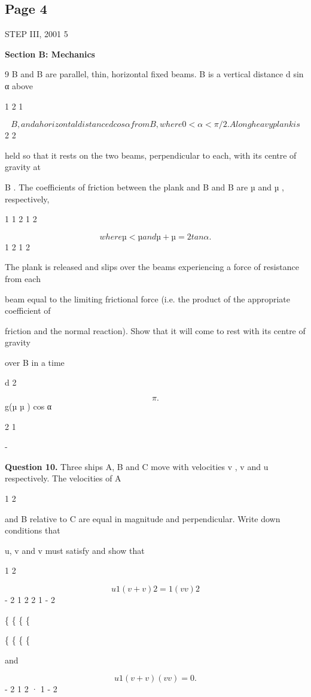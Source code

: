 \documentclass[12pt]{article}
\begin{document}
\subsection*{Page 4}
\begin{flushleft}
STEP III, 2001 5\par
\bigskip\textbf{Section B: Mechanics}\par
9 B and B are parallel, thin, horizontal fixed beams. B is a vertical distance d sin α above\par
1 2 1\par
\[B , and a horizontal distance d cos α from B , where 0 < α < \pi/2 . A long heavy plank is\]
2 2\par
held so that it rests on the two beams, perpendicular to each, with its centre of gravity at\par
B . The coefficients of friction between the plank and B and B are µ and µ , respectively,\par
1 1 2 1 2\par
\[where µ < µ and µ + µ = 2 tan α .\]
1 2 1 2\par
The plank is released and slips over the beams experiencing a force of resistance from each\par
beam equal to the limiting frictional force (i.e. the product of the appropriate coefficient of\par
friction and the normal reaction). Show that it will come to rest with its centre of gravity\par
over B in a time\par
d 2\par
\[\pi .\]
\lambda g(µ µ ) cos α \mu\par
2 1\par
-\par
\bigskip\textbf{Question 10.} Three ships A, B and C move with velocities v , v and u respectively. The velocities of A\par
1 2\par
and B relative to C are equal in magnitude and perpendicular. Write down conditions that\par
u, v and v must satisfy and show that\par
1 2\par
\[u 1 (v + v ) 2 = 1 (v v ) 2\]
- 2 1 2 2 1 - 2\par
\{ \{ \{ \{\par
\{ \{ \{ \{\par
and\par
\[u 1 (v + v ) (v v ) = 0 .\]
- 2 1 2 · 1 - 2\par

\end{flushleft}
\end{document}
